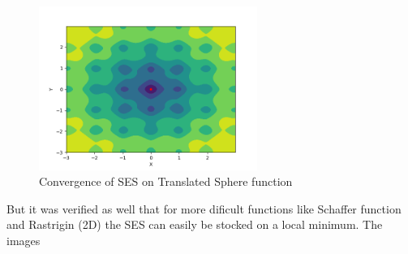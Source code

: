 



\begin{figure}
  \begin{center}
  \includegraphics[width=2.8in]{./../code/test_evolution_strategy_results/test_evolution_strategy-ackley-SES.png}
  \caption{Convergence of SES on Translated Sphere function}
  \label{img:test_evolution_strategy-ackley-SES}
  \end{center}
\end{figure}





But it was verified as well that for more dificult functions like Schaffer function and Rastrigin (2D) the SES can easily be stocked on a local minimum. The images


